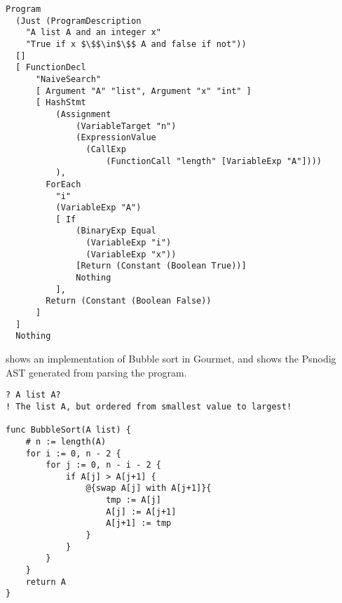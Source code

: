 \begin{lstlisting}[caption={The Psnodig AST generated by parsing \Cref{naiveSearchGourmet}.}, captionpos=b, label={nsAST}]
Program
  (Just (ProgramDescription
    "A list A and an integer x"
    "True if x $\$$\in$\$$ A and false if not"))
  []
  [ FunctionDecl
      "NaiveSearch"
      [ Argument "A" "list", Argument "x" "int" ]
      [ HashStmt
          (Assignment
              (VariableTarget "n")
              (ExpressionValue
                (CallExp
                    (FunctionCall "length" [VariableExp "A"])))
          ),
        ForEach
          "i"
          (VariableExp "A")
          [ If
              (BinaryExp Equal
                (VariableExp "i")
                (VariableExp "x"))
              [Return (Constant (Boolean True))]
              Nothing
          ],
        Return (Constant (Boolean False))
      ]
  ]
  Nothing
\end{lstlisting}

 shows an implementation of Bubble sort in Gourmet, and  shows the Psnodig AST generated from parsing the program. \\

\begin{lstlisting}[caption={Bubble sort implementation in Gourmet.}, captionpos=b, label={bubbleSortGourmet}]
? A list A?
! The list A, but ordered from smallest value to largest!

func BubbleSort(A list) {
    # n := length(A)
    for i := 0, n - 2 {
        for j := 0, n - i - 2 {
            if A[j] > A[j+1] {
                @{swap A[j] with A[j+1]}{
                    tmp := A[j]
                    A[j] := A[j+1]
                    A[j+1] := tmp
                }
            }
        }
    }
    return A
}
\end{lstlisting}

